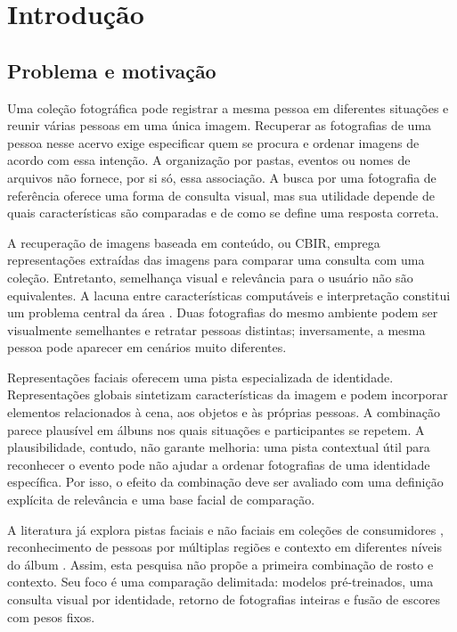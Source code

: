 \chapter{Introdução}\label{cap:introducao}
\section{Problema e motivação}
Uma coleção fotográfica pode registrar a mesma pessoa em diferentes situações e reunir várias pessoas em uma única imagem. Recuperar as fotografias de uma pessoa nesse acervo exige especificar quem se procura e ordenar imagens de acordo com essa intenção. A organização por pastas, eventos ou nomes de arquivos não fornece, por si só, essa associação. A busca por uma fotografia de referência oferece uma forma de consulta visual, mas sua utilidade depende de quais características são comparadas e de como se define uma resposta correta.

A recuperação de imagens baseada em conteúdo, ou CBIR, emprega representações extraídas das imagens para comparar uma consulta com uma coleção. Entretanto, semelhança visual e relevância para o usuário não são equivalentes. A lacuna entre características computáveis e interpretação constitui um problema central da área \cite{Smeulders2000}. Duas fotografias do mesmo ambiente podem ser visualmente semelhantes e retratar pessoas distintas; inversamente, a mesma pessoa pode aparecer em cenários muito diferentes.

Representações faciais oferecem uma pista especializada de identidade. Representações globais sintetizam características da imagem e podem incorporar elementos relacionados à cena, aos objetos e às próprias pessoas. A combinação parece plausível em álbuns nos quais situações e participantes se repetem. A plausibilidade, contudo, não garante melhoria: uma pista contextual útil para reconhecer o evento pode não ajudar a ordenar fotografias de uma identidade específica. Por isso, o efeito da combinação deve ser avaliado com uma definição explícita de relevância e uma base facial de comparação.

A literatura já explora pistas faciais e não faciais em coleções de consumidores \cite{Costache2008}, reconhecimento de pessoas por múltiplas regiões \cite{Zhang2015,Oh2015} e contexto em diferentes níveis do álbum \cite{Li2016}. Assim, esta pesquisa não propõe a primeira combinação de rosto e contexto. Seu foco é uma comparação delimitada: modelos pré-treinados, uma consulta visual por identidade, retorno de fotografias inteiras e fusão de escores com pesos fixos.

